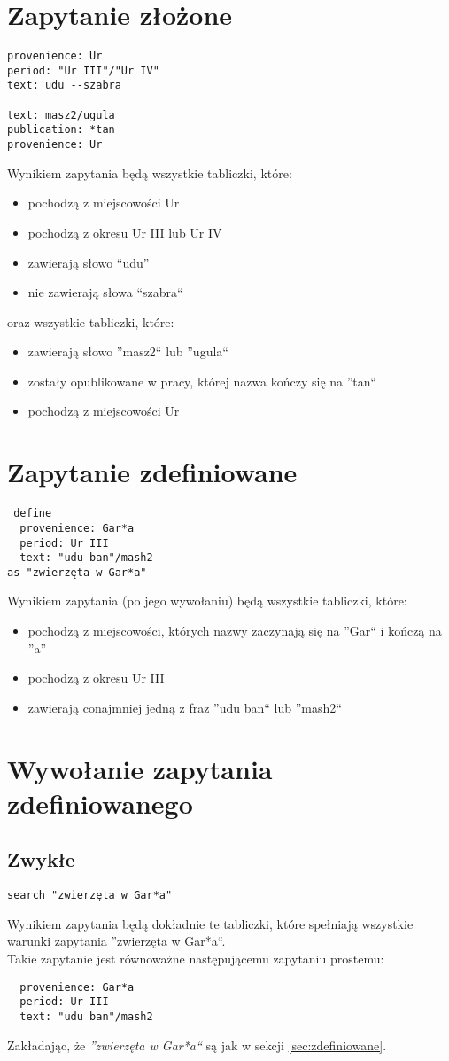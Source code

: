 \section{Zapytanie złożone}
\begin{verbatim}
provenience: Ur
period: "Ur III"/"Ur IV"
text: udu --szabra

text: masz2/ugula
publication: *tan
provenience: Ur
\end{verbatim}
Wynikiem zapytania będą wszystkie tabliczki, które:
\begin{itemize}
 \item pochodzą z miejscowości Ur
 \item pochodzą z okresu Ur III lub Ur IV
 \item zawierają słowo ``udu''
 \item nie zawierają słowa ``szabra``
\end{itemize}
oraz wszystkie tabliczki, które:
\begin{itemize}
 \item zawierają słowo ''masz2`` lub ''ugula``
 \item zostały opublikowane w pracy, której nazwa kończy się na ''tan``
 \item pochodzą z miejscowości Ur
\end{itemize}


\section{\label{sec:zdefiniowane} Zapytanie zdefiniowane}
\begin{verbatim}
 define
  provenience: Gar*a
  period: Ur III
  text: "udu ban"/mash2
as "zwierzęta w Gar*a"
\end{verbatim}
Wynikiem zapytania (po jego wywołaniu) będą wszystkie tabliczki, które:
\begin{itemize}
\item pochodzą z miejscowości, których nazwy zaczynają się na ''Gar`` i kończą na ''a''
\item pochodzą z okresu Ur III
\item zawierają conajmniej jedną z fraz ''udu ban`` lub ''mash2``
\end{itemize}

\section{Wywołanie zapytania zdefiniowanego}
\subsection{Zwykłe}
\begin{verbatim}
search "zwierzęta w Gar*a"
\end{verbatim}
Wynikiem zapytania będą dokładnie te tabliczki, które spełniają wszystkie warunki zapytania ''zwierzęta w Gar*a``.\\
Takie zapytanie jest równoważne następującemu zapytaniu prostemu:
\begin{verbatim}
  provenience: Gar*a
  period: Ur III
  text: "udu ban"/mash2
\end{verbatim}
Zakładając, że \textit{''zwierzęta w Gar*a``} są jak w sekcji \ref{sec:zdefiniowane}.
